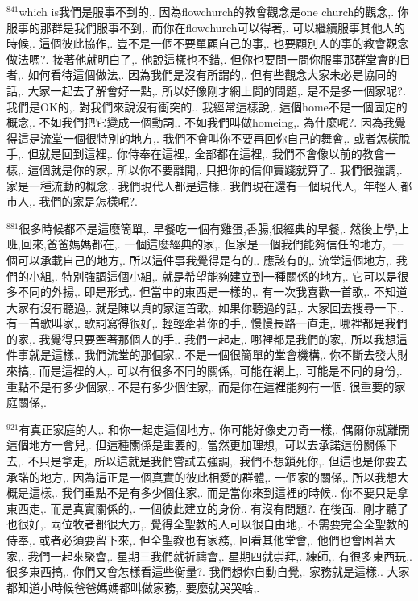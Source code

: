 \documentclass{book}
\begin{document}
$^{841}$which is我們是服事不到的,.
因為flowchurch的教會觀念是one church的觀念,.
你服事的那群是我們服事不到,.
而你在flowchurch可以得著,.
可以繼續服事其他人的時候,.
這個彼此協作,.
豈不是一個不要單顧自己的事,.
也要顧別人的事的教會觀念做法嗎?.
接著他就明白了,.
他說這樣也不錯,.
但你也要問一問你服事那群堂會的目者,.
如何看待這個做法,.
因為我們是沒有所謂的,.
但有些觀念大家未必是協同的話,.
大家一起去了解會好一點,.
所以好像剛才網上問的問題,.
是不是多一個家呢?.
我們是OK的,.
對我們來說沒有衝突的..
我經常這樣說,.
這個home不是一個固定的概念,.
不如我們把它變成一個動詞,.
不如我們叫做homeing,.
為什麼呢?.
因為我覺得這是流堂一個很特別的地方,.
我們不會叫你不要再回你自己的舞會,.
或者怎樣脫手,.
但就是回到這裡,.
你侍奉在這裡,.
全部都在這裡,.
我們不會像以前的教會一樣,.
這個就是你的家,.
所以你不要離開,.
只把你的信仰實踐就算了..
我們很強調,.
家是一種流動的概念,.
我們現代人都是這樣,.
我們現在還有一個現代人,.
年輕人,都市人,.
我們的家是怎樣呢?.

$^{881}$很多時候都不是這麼簡單,.
早餐吃一個有雞蛋,香腸,很經典的早餐,.
然後上學,上班,回來,爸爸媽媽都在,.
一個這麼經典的家,.
但家是一個我們能夠信任的地方,.
一個可以承載自己的地方,.
所以這件事我覺得是有的,.
應該有的,.
流堂這個地方,.
我們的小組,.
特別強調這個小組,.
就是希望能夠建立到一種關係的地方,.
它可以是很多不同的外揚,.
即是形式,.
但當中的東西是一樣的,.
有一次我喜歡一首歌,.
不知道大家有沒有聽過,.
就是陳以貞的家這首歌,.
如果你聽過的話,.
大家回去搜尋一下,.
有一首歌叫家,.
歌詞寫得很好,.
輕輕牽著你的手,.
慢慢長路一直走,.
哪裡都是我們的家,.
我覺得只要牽著那個人的手,.
我們一起走,.
哪裡都是我們的家,.
所以我想這件事就是這樣,.
我們流堂的那個家,.
不是一個很簡單的堂會機構,.
你不斷去發大財來搞,.
而是這裡的人,.
可以有很多不同的關係,.
可能在網上,.
可能是不同的身份,.
重點不是有多少個家,.
不是有多少個住家,.
而是你在這裡能夠有一個.
很重要的家庭關係,.

$^{921}$有真正家庭的人,.
和你一起走這個地方,.
你可能好像史力奇一樣,.
偶爾你就離開這個地方一會兒,.
但這種關係是重要的,.
當然更加理想,.
可以去承諾這份關係下去,.
不只是拿走,.
所以這就是我們嘗試去強調,.
我們不想鎖死你,.
但這也是你要去承諾的地方,.
因為這正是一個真實的彼此相愛的群體,.
一個家的關係,.
所以我想大概是這樣,.
我們重點不是有多少個住家,.
而是當你來到這裡的時候,.
你不要只是拿東西走,.
而是真實關係的,.
一個彼此建立的身份..
有沒有問題?.
在後面..
剛才聽了也很好,.
兩位牧者都很大方,.
覺得全聖教的人可以很自由地,.
不需要完全全聖教的侍奉,.
或者必須要留下來,.
但全聖教也有家務,.
回看其他堂會,.
他們也會困著大家,.
我們一起來聚會,.
星期三我們就祈禱會,.
星期四就崇拜,.
練師,.
有很多東西玩,.
很多東西搞,.
你們又會怎樣看這些衡量?.
我們想你自動自覺,.
家務就是這樣,.
大家都知道小時候爸爸媽媽都叫做家務,.
要麼就哭哭啥,.
\end{document}
